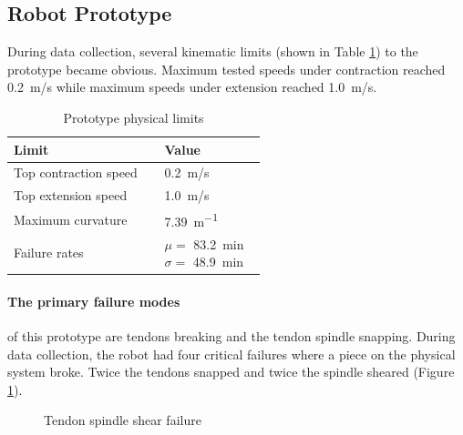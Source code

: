 \subsection{Robot Prototype}
During data collection, several kinematic limits (shown in Table \ref{tab:physical_limits}) to the prototype became obvious. Maximum tested speeds under contraction reached \SI{0.2}{m/s} while maximum speeds under extension reached \SI{1.0}{m/s}. 

\begin{table}[h]
    \centering   
    \caption{Prototype physical limits}
    \begin{tabular}{p{0.35\linewidth} | p{0.2\linewidth}}
        \textbf{Limit} & \textbf{Value} \\
        \hline
        Top contraction speed & \SI{0.2}{m/s} \\
        Top extension speed & \SI{1.0}{m/s} \\
        Maximum curvature & \SI{7.39}{m^{-1}} \\
        Failure rates & $\mu =$ \SI{83.2}{min}\newline$\sigma =$ \SI{48.9}{min}
    \end{tabular}
    \label{tab:physical_limits}
\end{table}

\paragraph{The primary failure modes} of this prototype are tendons breaking and the tendon spindle snapping. During data collection, the robot had four critical failures where a piece on the physical system broke. Twice the tendons snapped and twice the spindle sheared (Figure \ref{fig:sheared_spindle}). 

\begin{figure}[h]
    \centering
    \caption{Tendon spindle shear failure}
    \label{fig:sheared_spindle}
\end{figure}